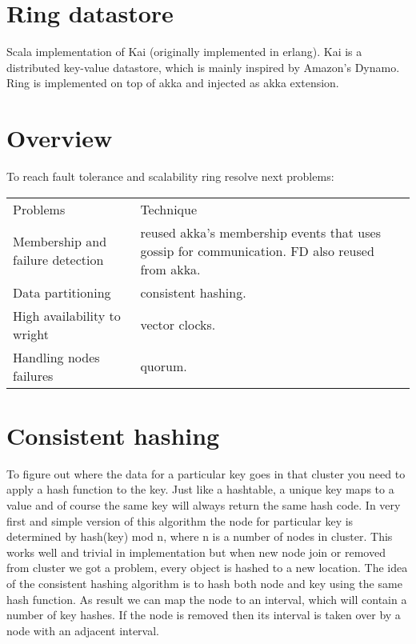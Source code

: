 \section{Ring datastore}

Scala implementation of Kai (originally implemented in erlang).
Kai is a distributed key-value datastore, which is mainly inspired
by Amazon's Dynamo. Ring is implemented on top of akka and injected as akka extension.

\section*{Overview}

To reach fault tolerance and scalability ring resolve next problems:


\begin{center}
      \begin{tabular}{| l | l |}
          Problems & Technique \\
          Membership and failure detection & reused akka's membership events that uses gossip for communication. FD also reused from akka. \\
          Data partitioning  & consistent hashing. \\
          High availability to wright  & vector clocks. \\
          Handling nodes failures   & quorum. \\
      \end{tabular}
\end{center}


\section*{Consistent hashing}

To figure out where the data for a particular key goes in that cluster you need to apply a hash function to the key.
Just like a hashtable, a unique key maps to a value and of course the same key will always return the same hash code.
In very first and simple version of this algorithm the node for particular key is determined by hash(key) mod n, where n is a number of
nodes in cluster. This works well and trivial in implementation but when new node join or removed from cluster we got a problem, every object is hashed to a new location.
The idea of the consistent hashing algorithm is to hash both node and key using the same hash function.
As result we can map the node to an interval, which will contain a number of key hashes. If the node is removed
then its interval is taken over by a node with an adjacent interval.

